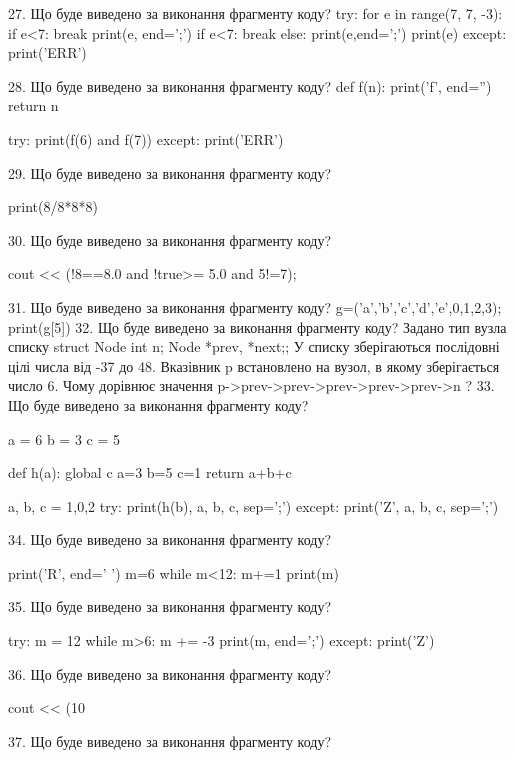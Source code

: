 \documentclass[11pt]{article}
\begin{document}
27. Що буде виведено за виконання фрагменту коду?
try:
    for e in range(7, 7, -3):
        if e<7:
            break
        print(e, end=';')
        if e<7:
            break
    else:
        print(e,end=';')
    print(e)
except:
    print('ERR')

28. Що буде виведено за виконання фрагменту коду?
def f(n):
    print('f', end='')
    return n

try:
    print(f(6) and f(7))
except:
    print('ERR')

29. Що буде виведено за виконання фрагменту коду?

print(8/8*8*8)

30. Що буде виведено за виконання фрагменту коду?

cout << (!8==8.0 and !true>= 5.0 and 5!=7);

31. Що буде виведено за виконання фрагменту коду?
g=('a','b','c','d','e',0,1,2,3); print(g[5])
32. Що буде виведено за виконання фрагменту коду?
Задано тип вузла списку struct Node {int n; Node *prev, *next;};
У списку зберігаються послідовні цілі числа від -37 до 48. Вказівник p встановлено на вузол, в якому зберігається число 6.
Чому дорівнює значення p->prev->prev->prev->prev->prev->n ?
33. Що буде виведено за виконання фрагменту коду?

a = 6
b = 3
c = 5

def h(a):
global c    a=3
    b=5
    c=1
    return a+b+c

a, b, c = 1,0,2
try:
    print(h(b), a, b, c, sep=';')
except:
    print('Z', a, b, c, sep=';')

34. Що буде виведено за виконання фрагменту коду?

print('R', end=' ')
m=6
while m<12:
    m+=1
print(m)


35. Що буде виведено за виконання фрагменту коду?

try:
    m = 12
    while m>6:
        m += -3
    print(m, end=';')
except:
    print('Z')


36. Що буде виведено за виконання фрагменту коду?

cout << (10 %

37. Що буде виведено за виконання фрагменту коду?
\end{document}
